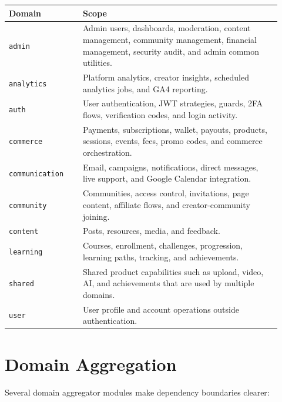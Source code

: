 \documentclass[11pt,a4paper]{article}
\begin{document}
\begin{center}
\begin{tabular}{p{0.25\linewidth} p{0.67\linewidth}}
\toprule
\textbf{Domain} & \textbf{Scope} \\
\midrule
\texttt{admin} & Admin users, dashboards, moderation, content management, community management, financial management, security audit, and admin common utilities. \\
\texttt{analytics} & Platform analytics, creator insights, scheduled analytics jobs, and GA4 reporting. \\
\texttt{auth} & User authentication, JWT strategies, guards, 2FA flows, verification codes, and login activity. \\
\texttt{commerce} & Payments, subscriptions, wallet, payouts, products, sessions, events, fees, promo codes, and commerce orchestration. \\
\texttt{communication} & Email, campaigns, notifications, direct messages, live support, and Google Calendar integration. \\
\texttt{community} & Communities, access control, invitations, page content, affiliate flows, and creator-community joining. \\
\texttt{content} & Posts, resources, media, and feedback. \\
\texttt{learning} & Courses, enrollment, challenges, progression, learning paths, tracking, and achievements. \\
\texttt{shared} & Shared product capabilities such as upload, video, AI, and achievements that are used by multiple domains. \\
\texttt{user} & User profile and account operations outside authentication. \\
\bottomrule
\end{tabular}
\end{center}

\section*{Domain Aggregation}

Several domain aggregator modules make dependency boundaries clearer:
\end{document}
